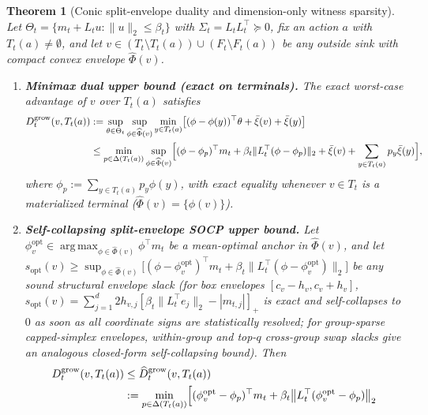 \documentclass{article}
\theoremstyle{plain}
\newtheorem{theorem}{Theorem}[section]
\theoremstyle{definition}
\DeclareMathOperator*{\argmax}{arg\,max}
\begin{document}
\begin{theorem}[Conic split-envelope duality and dimension-only witness sparsity]
\label{thm:growing-conic-duality}
Let $\Theta_t = \{m_t + L_t u : \|u\|_2 \le \beta_t\}$ with $\Sigma_t = L_t L_t^\top \succeq 0$, fix an action $a$ with $T_t(a) \neq \emptyset$, and let $v \in (T_t \setminus T_t(a)) \cup (F_t \setminus F_t(a))$ be any outside sink with compact convex envelope $\widehat\Phi(v)$.
\begin{enumerate}[label=(\alph*),leftmargin=1.8em]
  \item \textbf{Minimax dual upper bound (exact on terminals).} The exact worst-case advantage of $v$ over $T_t(a)$ satisfies
  \begin{align}
    D_t^{\mathrm{grow}}(v, T_t(a))
    &:= \sup_{\theta \in \Theta_t} \sup_{\phi \in \widehat\Phi(v)} \min_{y \in T_t(a)}
        \bigl[(\phi - \phi(y))^\top \theta + \bar\xi(v) + \bar\xi(y)\bigr] \nonumber\\
    &\le \min_{p \in \Delta(T_t(a))} \sup_{\phi \in \widehat\Phi(v)}
       \Bigl[(\phi - \phi_p)^\top m_t + \beta_t \|L_t^\top(\phi - \phi_p)\|_2 + \bar\xi(v) + \sum_{y \in T_t(a)} p_y \bar\xi(y)\Bigr],
    \label{eq:growing-exact-dual}
  \end{align}
  where $\phi_p := \sum_{y \in T_t(a)} p_y \phi(y)$, with exact equality whenever $v \in T_t$ is a materialized terminal ($\widehat\Phi(v) = \{\phi(v)\}$).
  \item \textbf{Self-collapsing split-envelope SOCP upper bound.} Let $\phi_v^{\mathrm{opt}} \in \argmax_{\phi \in \widehat\Phi(v)} \phi^\top m_t$ be a mean-optimal anchor in $\widehat\Phi(v)$, and let $s_{\mathrm{opt}}(v) \ge \sup_{\phi \in \widehat\Phi(v)} \bigl[(\phi - \phi_v^{\mathrm{opt}})^\top m_t + \beta_t \|L_t^\top(\phi - \phi_v^{\mathrm{opt}})\|_2\bigr]$ be any sound \emph{structural envelope slack} (for box envelopes $[c_v - h_v, c_v + h_v]$, $s_{\mathrm{opt}}(v) = \sum_{j=1}^d 2 h_{v,j} [\beta_t \|L_t^\top e_j\|_2 - |m_{t,j}|]_+$ is exact and self-collapses to $0$ as soon as all coordinate signs are statistically resolved; for group-sparse capped-simplex envelopes, within-group and top-$q$ cross-group swap slacks give an analogous closed-form self-collapsing bound). Then
  \begin{align}
    D_t^{\mathrm{grow}}(v, T_t(a))
    &\le \widehat D_t^{\mathrm{grow}}(v, T_t(a)) \nonumber\\
    &:= \min_{p \in \Delta(T_t(a))}
       \Bigl[
         (\phi_v^{\mathrm{opt}} - \phi_p)^\top m_t
         + \beta_t \bigl\|L_t^\top(\phi_v^{\mathrm{opt}} - \phi_p)\bigr\|_2

\end{align}
\end{enumerate}
\end{theorem}
\end{document}
